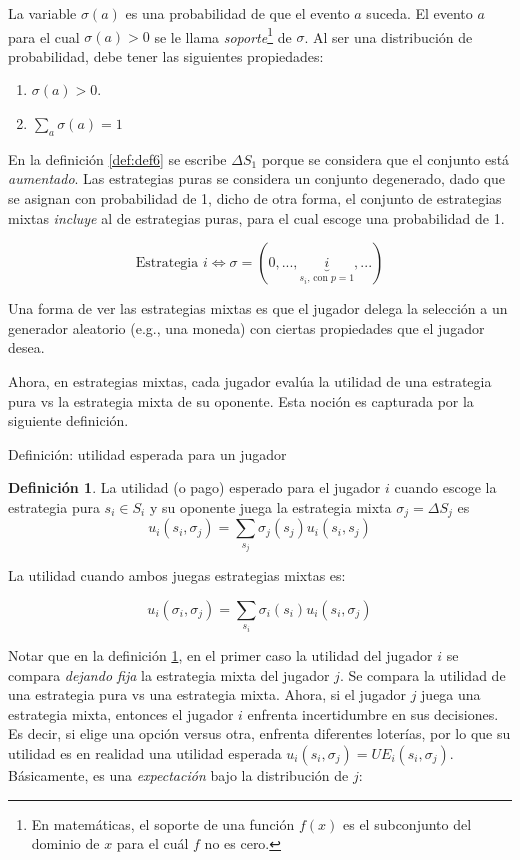 \documentclass[12pt]{scrartcl}
\theoremstyle{definition}
\newtheorem{defi}{Definición}[section]
\begin{document}
La variable $\sigma(a)$ es una probabilidad de que el evento $a$ suceda. El evento $a$ para el cual $\sigma(a) > 0$ se le llama \textit{soporte}\footnote{
En matemáticas, el soporte de una función $f(x)$ es el subconjunto del dominio de $x$ para el cuál $f$ no es cero.
} de $\sigma$. Al ser una distribución de probabilidad, debe tener las siguientes propiedades:

\begin{enumerate}
    \item $\sigma(a) > 0$.
    \item $\sum_a \sigma(a) = 1$
\end{enumerate}
En la definición \ref{def:def6} se escribe $\Delta S_1$ porque se considera que el conjunto está \textit{aumentado}. Las estrategias puras se considera un conjunto degenerado, dado que se asignan con probabilidad de 1, dicho de otra forma, el conjunto de estrategias mixtas \textit{incluye} al de estrategias puras, para el cual escoge una probabilidad de 1. 

\[ \text{Estrategia } i \Longleftrightarrow \sigma = (0, ..., \underbrace{i}_\text{$s_i$, con $p=1$}, ... )\]

Una forma de ver las estrategias mixtas es que el jugador delega la selección a un generador aleatorio (e.g., una moneda) con ciertas propiedades que el jugador desea. 

Ahora, en estrategias mixtas, cada jugador evalúa la utilidad de una estrategia pura vs la estrategia mixta de su oponente. Esta noción es capturada por la siguiente definición.

\begin{mybox}{Definición: utilidad esperada para un jugador}
    \begin{defi}
        La utilidad (o pago) esperado para el jugador $i$ cuando escoge la estrategia pura $s_i \in S_i$ y su oponente juega la estrategia mixta $\sigma_{j} = \Delta S_{j}$ es 
        \[ u_i(s_i, \sigma_{j}) = \sum_{s_{j}} \sigma_{j}(s_{j})u_i(s_i,s_{j}) \]
        
        La utilidad cuando ambos juegas estrategias mixtas es:
        
        \[ u_i(\sigma_i, \sigma_{j}) = \sum_{s_{i}} \sigma_{i}(s_i)u_i(s_i,\sigma_{j}) \]

        \label{def:def_mix_util}
    \end{defi}
\end{mybox}

Notar que en la definición \ref{def:def_mix_util}, en el primer caso la utilidad del jugador $i$ se compara \textit{dejando fija} la estrategia mixta del jugador $j$. Se compara la utilidad de una estrategia pura vs una estrategia mixta. Ahora, si el jugador $j$ juega una estrategia mixta, entonces el jugador $i$ enfrenta incertidumbre en sus decisiones. Es decir, si elige una opción versus otra, enfrenta diferentes loterías, por lo que su utilidad es en realidad una utilidad esperada $u_i(s_i, \sigma_{j}) = UE_i(s_i, \sigma_{j})$. Básicamente, es una \textit{expectación} bajo la distribución de $ j $:
\end{document}
